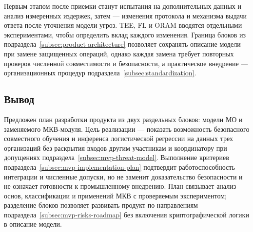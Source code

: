 Первым этапом после приемки станут испытания на дополнительных данных и анализ измеренных издержек, затем --- изменения протокола и механизма выдачи ответа после уточнения модели угроз. TEE, FL и ORAM вводятся отдельными экспериментами, чтобы определить вклад каждого изменения. Граница блоков из подраздела~\ref{subsec:product-architecture} позволяет сохранять описание модели при замене защищенных операций, однако каждая замена требует повторных проверок численной совместимости и безопасности, а практическое внедрение --- организационных процедур подраздела~\ref{subsec:standardization}.

\subsection{Вывод}
\label{subsec:mvp-conclusion}

Предложен план разработки продукта из двух раздельных блоков: модели МО и заменяемого МКВ-модуля. Цель реализации --- показать возможность безопасного совместного обучения и инференса логистической регрессии на данных трех организаций без раскрытия входов другим участникам и координатору при допущениях подраздела~\ref{subsec:mvp-threat-model}. Выполнение критериев подраздела~\ref{subsec:mvp-implementation-plan} подтвердит работоспособность интеграции и численные допуски, но не заменит доказательство безопасности и не означает готовности к промышленному внедрению. План связывает анализ основ, классификации и применений МКВ с проверяемым экспериментом; разделение блоков позволяет развивать продукт по направлениям подраздела~\ref{subsec:mvp-risks-roadmap} без включения криптографической логики в описание модели.